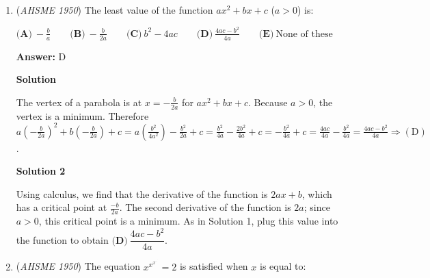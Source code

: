 \begin{enumerate}
 



\textbf{Solution 2}

If $x \neq 1$, then $\frac {x^2-1}{x-1} = \frac{(x+1)(x-1)}{x-1} = x+1$. 

 Therefore, as $x$ approaches $1$, $\frac {x^2-1}{x-1} = x + 1$ approaches $1 + 1 = \boxed{\textbf{(D)}\ 2}$.

 



\textbf{Solution 3 (Formal)}

Let $f(x) = \frac{x^2-1}{x-1}$.  Then if $x \neq 1$, $f(x) = \frac {x^2-1}{x-1} = \frac{(x+1)(x-1)}{x-1} = x+1$. 

 Let $\epsilon > 0$ be any positive real number and let $\delta = \epsilon$.  Then if $0 < |x-1| < \delta$, $|x-1| = |x+1-2| = |f(x)-2| < \delta = \epsilon$, so $\lim \limits_{x\to 1}\frac{x^2-1}{x-1} = \boxed{\textbf{(D)}\ 2}$ by the definition of the limit.

 -j314andrews

 


	\item (\textit{AHSME 1950}) The least value of the function $ax^2+bx+c$ ($a>0$) is:


 $\textbf{(A)}\ -\frac{b}{a}\qquad\textbf{(B)}\ -\frac{b}{2a}\qquad\textbf{(C)}\ b^{2}-4ac\qquad\textbf{(D)}\ \frac{4ac-b^{2}}{4a}\qquad\textbf{(E)}\ \text{None of these}$

 \textbf{Answer: }D



\textbf{Solution}

The vertex of a parabola is at $x=-\frac{b}{2a}$ for $ax^2+bx+c$. Because $a>0$, the vertex is a minimum. Therefore $a(-\frac{b}{2a})^2+b(-\frac{b}{2a})+c=a(\frac{b^2}{4a^2})-\frac{b^2}{2a}+c=\frac{b^2}{4a}-\frac{2b^2}{4a}+c=-\frac{b^2}{4a}+c=\frac{4ac}{4a}-\frac {b^2}{4a}=\frac{4ac-b^2}{4a} \Rightarrow \mathrm{(D)}$.

 



\textbf{Solution 2}

Using calculus, we find that the derivative of the function is $2ax + b$, which has a critical point at $\frac{-b}{2a}$. The second derivative of the function is $2a$; since $a > 0$, this critical point is a minimum. As in Solution 1, plug this value into the function to obtain $\boxed{\textbf{(D)}\ \dfrac{4ac-b^2}{4a}}$.

 


	\item (\textit{AHSME 1950}) The equation $x^{x^{x^{.^{.^.}}}}=2$ is satisfied when $x$ is equal to:



\end{enumerate}
